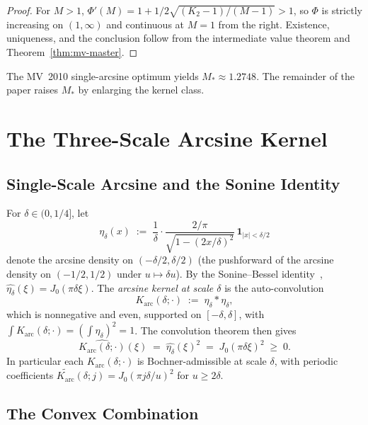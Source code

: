 \documentclass[11pt, letterpaper]{article}
\theoremstyle{plain}
\theoremstyle{definition}
\newcommand{\Karc}{K_{\mathrm{arc}}}
\begin{document}
\begin{proof}
For $M>1$, $\Phi'(M)=1+1/2\sqrt{(K_2-1)/(M-1)}>1$, so $\Phi$ is
strictly increasing on $(1,\infty)$ and continuous at $M=1$ from the
right.  Existence, uniqueness, and the conclusion follow from the
intermediate value theorem and Theorem~\ref{thm:mv-master}.
\end{proof}

The MV~2010 single-arcsine optimum yields $M_*\approx 1.2748$.  The
remainder of the paper raises $M_*$ by enlarging the kernel class.

\section{The Three-Scale Arcsine Kernel}\label{sec:kernel}

\subsection{Single-Scale Arcsine and the Sonine Identity}\label{subsec:kernel-single}

For $\delta\in(0,1/4]$, let
\[
  \eta_\delta(x)
  \;:=\;
  \frac{1}{\delta}\cdot
  \frac{2/\pi}{\sqrt{1-(2x/\delta)^2}}\,
  \mathbf{1}_{|x|<\delta/2}
\]
denote the arcsine density on $(-\delta/2,\delta/2)$ (the
pushforward of the arcsine density on $(-1/2,1/2)$ under
$u\mapsto\delta u$).  By the Sonine--Bessel
identity~\cite[\S 13.46]{Watson}, $\widehat{\eta_\delta}(\xi)
=J_0(\pi\delta\xi)$.  The \emph{arcsine kernel at scale $\delta$} is the
auto-convolution
\[
  \Karc(\delta;\cdot)
  \;:=\;
  \eta_\delta*\eta_\delta,
\]
which is nonnegative and even, supported on $[-\delta,\delta]$, with
$\int\Karc(\delta;\cdot)=(\int\eta_\delta)^2=1$.  The convolution
theorem then gives
\begin{equation}\label{eq:sonine}
  \widehat{\Karc(\delta;\cdot)}(\xi)
  \;=\;
  \widehat{\eta_\delta}(\xi)^{2}
  \;=\; J_0(\pi\delta\xi)^2
  \;\ge\; 0.
\end{equation}
In particular each $\Karc(\delta;\cdot)$ is Bochner-admissible at
scale $\delta$, with periodic coefficients
$\widetilde{\Karc}(\delta;j)=J_0(\pi j\delta/u)^2$ for $u\ge 2\delta$.

\subsection{The Convex Combination}\label{subsec:kernel-combo}
\end{document}
